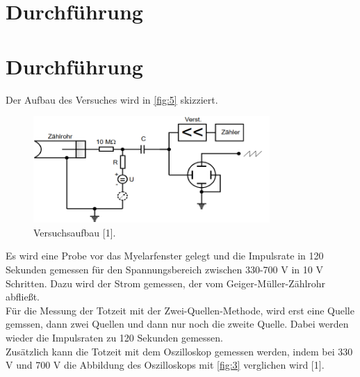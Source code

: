 \section{Durchführung}
\label{sec:Durchführung}

\section{Durchführung}
Der Aufbau des Versuches wird in \autoref{fig:5} skizziert.
\begin{figure}[H] 
  \centering 
  \includegraphics[width=9cm]{5} 
  \caption{Versuchsaufbau [1].} 
  \label{fig:5} 
\end{figure}
Es wird eine Probe vor das Myelarfenster gelegt und die Impulsrate in 120 Sekunden gemessen für den Spannungsbereich zwischen 330-700 V in 10 V Schritten. Dazu wird der Strom gemessen, der vom Geiger-Müller-Zählrohr abfließt.\\
Für die Messung der Totzeit mit der Zwei-Quellen-Methode, wird erst eine Quelle gemssen, dann zwei Quellen und dann nur noch die zweite Quelle. Dabei werden wieder die Impulsraten zu 120 Sekunden gemessen.\\
Zusätzlich kann die Totzeit mit dem Oszilloskop gemessen werden, indem bei 330 V und 700 V die Abbildung des Oszilloskops mit \autoref{fig:3} verglichen wird [1]. 
